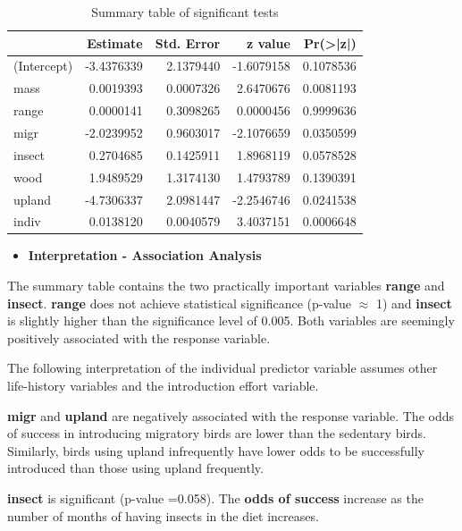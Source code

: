 \documentclass[
]{book}
\providecommand{\tightlist}{%
  \setlength{\itemsep}{0pt}\setlength{\parskip}{0pt}}
\begin{document}
\begin{table}

\caption{\label{tab:unnamed-chunk-102}Summary table of significant tests}
\centering
\begin{tabular}[t]{l|r|r|r|r}
\hline
  & Estimate & Std. Error & z value & Pr(>|z|)\\
\hline
(Intercept) & -3.4376339 & 2.1379440 & -1.6079158 & 0.1078536\\
\hline
mass & 0.0019393 & 0.0007326 & 2.6470676 & 0.0081193\\
\hline
range & 0.0000141 & 0.3098265 & 0.0000456 & 0.9999636\\
\hline
migr & -2.0239952 & 0.9603017 & -2.1076659 & 0.0350599\\
\hline
insect & 0.2704685 & 0.1425911 & 1.8968119 & 0.0578528\\
\hline
wood & 1.9489529 & 1.3174130 & 1.4793789 & 0.1390391\\
\hline
upland & -4.7306337 & 2.0981447 & -2.2546746 & 0.0241538\\
\hline
indiv & 0.0138120 & 0.0040579 & 3.4037151 & 0.0006648\\
\hline
\end{tabular}
\end{table}

\begin{itemize}
\tightlist
\item
  \textbf{Interpretation - Association Analysis}
\end{itemize}

The summary table contains the two practically important variables \textbf{range} and \textbf{insect}. \textbf{range} does not achieve statistical significance (p-value \(\approx\) 1) and \textbf{insect} is slightly higher than the significance level of 0.005. Both variables are seemingly positively associated with the response variable.

The following interpretation of the individual predictor variable assumes other life-history variables and the introduction effort variable.

\textbf{migr} and \textbf{upland} are negatively associated with the response variable. The odds of success in introducing migratory birds are lower than the sedentary birds. Similarly, birds using upland infrequently have lower odds to be successfully introduced than those using upland frequently.

\textbf{insect} is significant (p-value =0.058). The \textbf{odds of success} increase as the number of months of having insects in the diet increases.
\end{document}
